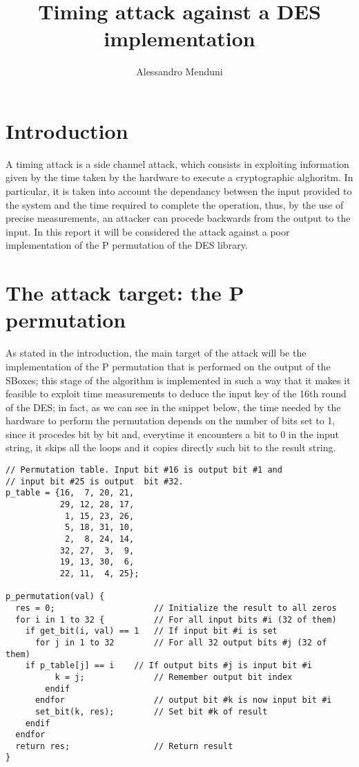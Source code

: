 \documentclass[11pt]{article} %
\title{Timing attack against a DES implementation}
\author{Alessandro Menduni}
\begin{document}
\maketitle

\section{Introduction}
A timing attack is a side channel attack, which consists in exploiting information given by the time taken by the hardware to execute a cryptographic alghoritm. In particular, it is taken into account the dependancy between the input provided to the system and the time required to complete the operation, thus, by the use of precise measurements, an attacker can procede backwards from the output to the input. In this report it will be considered the attack against a poor implementation of the P permutation of the DES library.

\section{The attack target: the P permutation}
As stated in the introduction, the main target of the attack will be the implementation of the P permutation that is performed on the output of the SBoxes; this stage of the algorithm is implemented in such a way that it makes it feasible to exploit time measurements to deduce the input key of the 16th round of the DES; in fact, as we can see in the snippet below, the time needed by the hardware to perform the permutation depends on the number of bits set to 1, since it procedes bit by bit and, everytime it encounters a bit to 0 in the input string, it skips all the loops and it copies directly such bit to the result string.

\vspace{1 mm}
\begin{lstlisting}
// Permutation table. Input bit #16 is output bit #1 and
// input bit #25 is output  bit #32.
p_table = {16,  7, 20, 21,
           29, 12, 28, 17,
            1, 15, 23, 26,
            5, 18, 31, 10,
            2,  8, 24, 14,
           32, 27,  3,  9,
           19, 13, 30,  6,
           22, 11,  4, 25};

p_permutation(val) {
  res = 0;                    // Initialize the result to all zeros
  for i in 1 to 32 {          // For all input bits #i (32 of them)
    if get_bit(i, val) == 1   // If input bit #i is set
      for j in 1 to 32        // For all 32 output bits #j (32 of them)
	if p_table[j] == i    // If output bits #j is input bit #i
          k = j;              // Remember output bit index
        endif
      endfor                  // output bit #k is now input bit #i
      set_bit(k, res);        // Set bit #k of result
    endif
  endfor
  return res;                 // Return result
}
\end{lstlisting}
\end{document}
